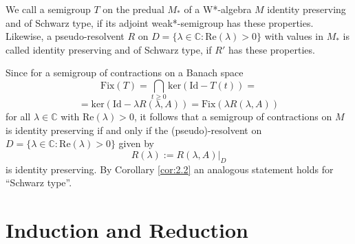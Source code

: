 \begin{definition}\label{def:2.4}
We call a semigroup $ T $ on the predual $ M_* $ of a W*-algebra $ M $ identity preserving and of Schwarz type, if its adjoint weak*-semigroup has these properties.
Likewise, a pseudo-resolvent $ R $ on $ D = \{\lambda \in \mathbb{C} : \text{Re}(\lambda) > 0\} $ with values in $ M_* $ is called identity preserving and of Schwarz type, if $ R' $ has these properties.
\end{definition}

Since for a semigroup of contractions on a Banach space
\[
\text{Fix}(T) = \bigcap_{t \geq 0} \text{ker}(\text{Id} - T(t)) =
\]
\[
= \text{ker}(\text{Id} - \lambda R(\lambda,A)) = \text{Fix}(\lambda R(\lambda,A))
\]
for all $ \lambda \in \mathbb{C} $ with $ \text{Re}(\lambda) > 0 $, it follows that a semigroup of contractions on $ M $ is identity preserving if and only if the (pseudo)-resolvent on $ D = \{\lambda \in \mathbb{C} : \text{Re}(\lambda) > 0\} $ given by
\[
R(\lambda) := R(\lambda,A)|_D
\]
is identity preserving.
By Corollary \ref{cor:2.2} an analogous statement holds for \enquote{Schwarz type}.


\section{Induction and Reduction}

